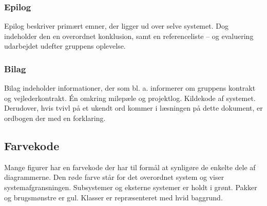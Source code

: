 \subsubsection{Epilog}
Epilog beskriver primært emner, der ligger ud over selve systemet. Dog indeholder den en overordnet konklusion, samt en referenceliste – og evaluering udarbejdet udefter gruppens oplevelse.

\subsubsection{Bilag}
Bilag indeholder informationer, der som bl. a. informerer om gruppens kontrakt og vejlederkontrakt. Én omkring milepæle og projektlog. Kildekode af systemet. Derudover, hvis tvivl på et ukendt ord kommer i læsningen på dette dokument, er ordbogen der med en forklaring.

\subsection{Farvekode}
Mange figurer har en farvekode der har til formål at synligøre de enkelte dele af diagrammerne. Den røde farve står for det overordnet system og viser systemafgransningen. Subsystemer og eksterne systemer er holdt i grønt. Pakker og brugsmønstre er gul. Klasser er repræsenteret med hvid baggrund.
